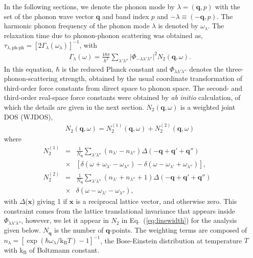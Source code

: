 \documentclass[twocolumn,amsmath,amssymb,a4paper,prb,superscriptaddress,floatfix]{revtex4-1}
\begin{document}
In the following sections, we denote the phonon mode by $\lambda=(\mathbf{q},p)$
with the set of the phonon wave vector $\mathbf{q}$ and band index $p$ and
$-\lambda \equiv (-\mathbf{q},p)$. The harmonic phonon frequency of the phonon
mode $\lambda$ is denoted by  $\omega_\lambda$. The relaxation time due to phonon-phonon
scattering was obtained as,
$\tau_{\lambda,\text{ph-ph}}=[2\Gamma_\lambda(\omega_\lambda)]^{-1}$, with
\begin{align}
 \label{eq:linewidth}
 &\Gamma_\lambda(\omega) = \frac{18\pi}{\hbar^2}
  \sum_{\lambda' \lambda''}
  \bigl|\Phi_{-\lambda\lambda'\lambda''}\bigl|^2 N_2(\mathbf{q},\omega).
\end{align}
In this equation, $\hbar$ is the reduced Planck constant and
$\Phi_{\lambda\lambda'\lambda''}$ denotes the three-phonon-scattering strength,
obtained by the usual coordinate transformation of third-order force constants
from direct space to phonon space.\cite{phono3py} The second- and third-order
real-space force constants were obtained by {\it ab initio} calculation, of
which the details are given in the next section. $N_2(\mathbf{q},\omega)$ is a
weighted joint DOS (WJDOS)\cite{phono3py},
\begin{align}
 \label{eq:jdos}
 &N_2(\mathbf{q},\omega) = N_2^{(1)}(\mathbf{q},\omega) +  N_2^{(2)}(\mathbf{q},\omega)
\end{align}
where 
\begin{eqnarray*}
	N_2^{(1)} & = & \frac{1}{N_\mathbf{q}} \sum_{\lambda'\lambda''}(n_{\lambda'}-n_{\lambda''})\Delta(-\mathbf{q} + \mathbf{q'} + \mathbf{q''}) \nonumber \\
								   & \times & [\delta(\omega + \omega_{\lambda'} - \omega_{\lambda''}) - \delta(\omega - \omega_{\lambda'} + \omega_{\lambda''})],\\
	N_2^{(2)} & = & \frac{1}{N_\mathbf{q}} \sum_{\lambda'\lambda''}(n_{\lambda'} + n_{\lambda''}+1)\Delta(-\mathbf{q} + \mathbf{q'} + \mathbf{q''}) \nonumber \\
								   & \times & \delta(\omega - \omega_{\lambda'} - \omega_{\lambda''}),
\end{eqnarray*}
with $\Delta$($\mathbf{x}$) giving 1 if $\mathbf{x}$ is a reciprocal lattice
vector, and otherwise zero. This constraint comes from the lattice
translational invariance that appears inside
$\Phi_{\lambda\lambda'\lambda''}$,\cite{phono3py} however, we let it appear in
$N_2$ in Eq.~(\ref{eq:linewidth}) for the analysis given below. $N_\mathbf{q}$
is the number of $\mathbf{q}$-points. The weighting terms are composed of
$n_\lambda=[\exp(\hbar\omega_\lambda/\mathrm{k_B}T)-1]^{-1}$, the Bose-Einstein
distribution at temperature $T$ with $\mathrm{k_B}$ of Boltzmann constant.
\end{document}
